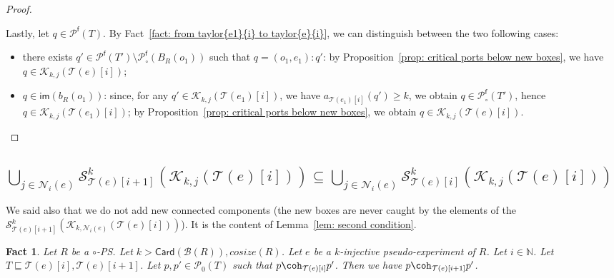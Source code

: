\documentclass{article}
\theoremstyle{plain}
\newtheorem{fact}[theorem]{Fact}
\newcommand{\Nat}{\ensuremath{\mathbb{N}}}
\newcommand{\nontrivialconnected}[3]{\mathcal{S}_{#1}^{#3}(#2)}
\newcommand{\taylor}[2]{\mathcal{T}(#1)[#2]}
\newcommand{\criticalports}[3]{\mathcal{K}_{#2, #3}(#1)}
\newcommand{\cosize}[1]{\textit{cosize}(#1)}
\newcommand{\im}[1]{\textsf{im}(#1)}
\newcommand{\portsatzero}[1]{\mathcal{P}_0(#1)}
\newcommand{\arity}[1]{{\textit{a}}_{#1}}
\newcommand{\conclusions}[1]{\mathcal{P}^{\textsf{f}}(#1)}
\newcommand{\Card}[1]{\textsf{Card}\left( #1 \right)}
\newcommand{\conclusionscirc}[1]{\mathcal{P}_\circ^{\textsf{f}}(#1)}
\newcommand{\boxes}[1]{\mathcal{B}(#1)}
\begin{document}
\begin{proof}
\begin{itemize}
Lastly, let $q \in \conclusions{T}$. By Fact~\ref{fact: from taylor{e1}{i} to taylor{e}{i}}, we can distinguish between the two following cases:
\begin{itemize}
\item there exists $q' \in \conclusions{T'} \setminus \conclusionscirc{B_R(o_1)}$ such that $q = (o_1, e_1) : q'$: by Proposition~\ref{prop: critical ports below new boxes}, we have $q \in \criticalports{\taylor{e}{i}}{k}{j}$;
\item $q \in \im{b_R(o_1)}$: since, for any $q' \in \criticalports{\taylor{e_1}{i}}{k}{j}$, we have $\arity{\taylor{e_1}{i}}(q') \geq k$, we obtain $q \in \conclusionscirc{T'}$, hence $q \in \criticalports{\taylor{e_1}{i}}{k}{j}$; by Proposition~\ref{prop: critical ports below new boxes}, we obtain $q \in \criticalports{\taylor{e}{i}}{k}{j}$.
\end{itemize}
\end{itemize}
\end{proof}

\subsection{$\bigcup_{j \in \mathcal{N}_i(e)} \nontrivialconnected{\taylor{e}{i+1}}{\criticalports{\taylor{e}{i}}{k}{j}}{k} \subseteq \bigcup_{j \in \mathcal{N}_i(e)} \nontrivialconnected{\taylor{e}{i}}{\criticalports{\taylor{e}{i}}{k}{j}}{k}$}\label{subsection: cond_sup_2}

We said also that we do not add new connected components (the new boxes are never caught by the elements of the $\nontrivialconnected{\taylor{e}{i+1}}{\criticalports{\taylor{e}{i}}{k}{\mathcal{N}_i(e)}}{k}$). It is the content of Lemma~\ref{lem: second condition}.

\begin{fact}\label{fact: coh[i]}
Let $R$ be a $\circ$-PS. Let $k > \Card{\boxes{R}{}}, \cosize{R}$. 
Let $e$ be a $k$-injective pseudo-experiment of $R$. Let $i \in \Nat$. 
Let $T \sqsubseteq \taylor{e}{i}, \taylor{e}{i+1}$. 
Let $p, p' \in \portsatzero{T}$ such that $p \coh_{\taylor{e}{i}} p'$.
 Then we have $p \coh_{\taylor{e}{i+1}} p'$.
\end{fact}
\end{document}
